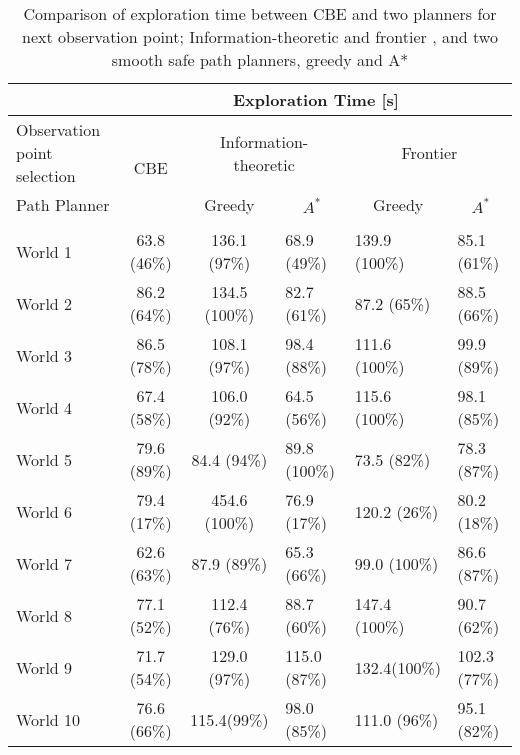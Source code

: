 \documentclass[shortAfour,sageh,times]{sagej_no_sage}
\begin{document}
\begin{table*}[t]
	\centering
	\caption{Comparison of exploration time between CBE and two planners for next observation point; Information-theoretic \citep{Makarenko2002} and frontier \citep{Yamauchi1997}, and two smooth safe path planners, greedy and A* 
	}
	\label{ExplorationTable}
	\renewcommand{\arraystretch}{1.5}
	\begin{tabular}{|l|c|c|l|l|l|}
		\hline
		& \multicolumn{5}{c|}{Exploration Time {[}s{]}} 
		\\ \hline
		Observation point selection & \multirow{2}{*}{CBE} & \multicolumn{2}{c|}{Information-theoretic}                    & \multicolumn{2}{c|}{Frontier}                            \\ \cline{1-1} \cline{3-6} 
		Path Planner                &                     & Greedy        & \multicolumn{1}{c|}{$A^*$} & \multicolumn{1}{c|}{Greedy} & \multicolumn{1}{c|}{$A^*$} \\ \hline
		& \multicolumn{5}{c|}{}                                                                                                       \\ \hline
		World 1                     & 63.8 (46\%)         & 136.1 (97\%)  & 68.9 (49\%)                & 139.9 (100\%)               & 85.1 (61\%)                 \\ \hline
		World 2                     & 86.2 (64\%)         & 134.5 (100\%) & 82.7 (61\%)                & 87.2 (65\%)                 & 88.5 (66\%)                 \\ \hline
		World 3                     & 86.5 (78\%)         & 108.1 (97\%)  & 98.4 (88\%)                & 111.6 (100\%)               & 99.9 (89\%)                 \\ \hline
		World 4                     & 67.4 (58\%)         & 106.0 (92\%)  & 64.5 (56\%)                & 115.6 (100\%)               & 98.1 (85\%)                 \\ \hline
		World 5                     & 79.6 (89\%)         & 84.4 (94\%)   & 89.8 (100\%)               & 73.5 (82\%)                 & 78.3 (87\%)                 \\ \hline
		World 6                     & 79.4 (17\%)         & 454.6 (100\%) & 76.9 (17\%)                & 120.2 (26\%)                & 80.2 (18\%)                 \\ \hline
		World 7                     & 62.6 (63\%)         & 87.9 (89\%)   & 65.3 (66\%)                & 99.0 (100\%)                & 86.6 (87\%)                 \\ \hline
		World 8                     & 77.1 (52\%)         & 112.4 (76\%)  & 88.7 (60\%)                & 147.4 (100\%)               & 90.7 (62\%)                 \\ \hline
		World 9                     & 71.7 (54\%)         & 129.0 (97\%)  & 115.0 (87\%)               & 132.4(100\%)                & 102.3 (77\%)                \\ \hline
		World 10                    & 76.6 (66\%)         & 115.4(99\%)   & 98.0 (85\%)                & 111.0 (96\%)                & 95.1 (82\%)                 \\ \hline
	\end{tabular}
\end{table*}
\end{document}
